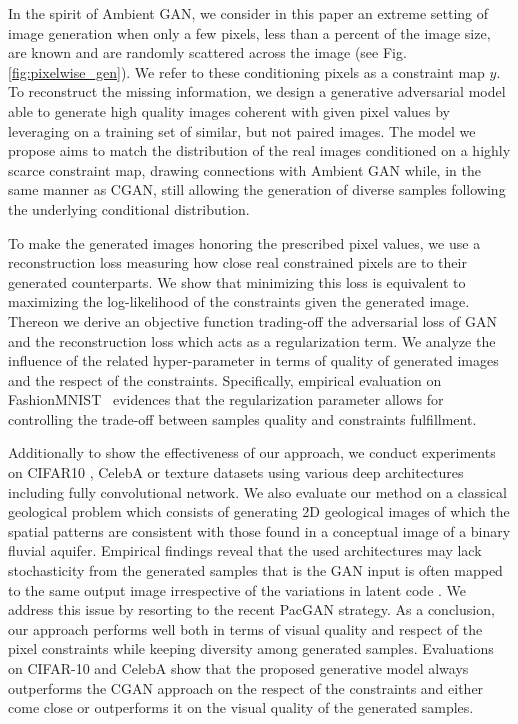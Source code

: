 In the spirit of Ambient GAN,  we consider in this paper an extreme setting of image generation when only a few pixels, less than a percent of the  image size, are known and are randomly scattered across the image (see Fig.\ref{fig:pixelwise_gen}). We refer to these conditioning pixels as a constraint map $y$. To reconstruct the missing information, we design a generative adversarial model able to generate high quality images coherent with given pixel values by leveraging on a training set of similar, but not paired images. The model we propose aims to match the distribution of the real images conditioned on a highly scarce constraint map, drawing connections with Ambient GAN while, in the same manner as CGAN, still allowing the generation of diverse samples following the underlying conditional distribution. 

To make the generated images honoring the prescribed pixel values, we use a reconstruction loss measuring how close real constrained pixels are to their generated counterparts. We show that minimizing this loss is equivalent to maximizing the log-likelihood of the constraints given the generated image. Thereon we derive an objective function trading-off the adversarial loss of GAN and the reconstruction loss which acts as a regularization term. We analyze the influence of the related hyper-parameter in terms of quality of generated images and the respect of the constraints. Specifically, empirical evaluation on FashionMNIST~\cite{Xiao2017} evidences that the regularization parameter allows for controlling the trade-off between samples quality and constraints fulfillment.

Additionally to show the effectiveness of our approach, we conduct experiments on CIFAR10 \cite{Krizhevsky2009CIFAR10}, CelebA \cite{liu2015celeba} or texture \cite{jetchev2016texture} datasets using various deep architectures including fully convolutional network. We also evaluate our method on a classical geological problem which consists of generating 2D geological images of which the spatial patterns are consistent with those found in a conceptual image of a binary fluvial aquifer\cite{Strebelle2002}\cite{laloy2018training}. Empirical findings reveal that the used architectures may lack stochasticity from the generated samples that is the GAN input is often mapped to the same output image irrespective of the variations in latent code \cite{yang2018diversitysensitive}. We address this issue by resorting to the recent PacGAN \cite{lin2018pacgan} strategy.
As a conclusion, our approach performs well both in terms of visual quality and respect of the pixel constraints while keeping diversity among generated samples. Evaluations on CIFAR-10 and CelebA show that the proposed generative model always outperforms the CGAN approach on the respect of the constraints and either come close or outperforms it on the visual quality of the generated samples.


